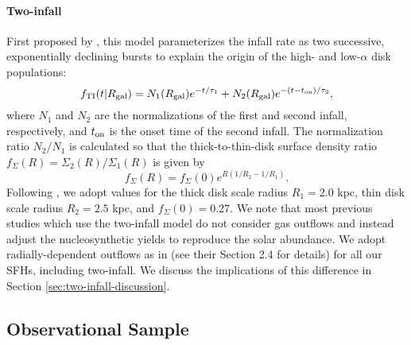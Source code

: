 \documentclass[twocolumn,twocolappendix,linenumbers,trackchanges]{aastex631}
\begin{document}
\paragraph{Two-infall} First proposed by \citet{Chiappini1997-TwoInfall}, this model parameterizes the infall rate as two successive, exponentially declining bursts to explain the origin of the high- and low-$\alpha$ disk populations:
\begin{equation}
    \label{eq:twoinfall-ifr}
    f_{\rm TI}(t|R_{\rm gal}) = N_1(R_{\rm gal}) e^{-t/\tau_1} + N_2(R_{\rm gal}) e^{-(t-t_{\rm on})/\tau_2},
\end{equation}
where $N_1$ and $N_2$ are the normalizations of the first and second infall, respectively, and $t_{\rm on}$ is the onset time of the second infall.
The normalization ratio $N_2/N_1$ is calculated so that the thick-to-thin-disk surface density ratio $f_\Sigma(R)=\Sigma_2(R)/\Sigma_1(R)$ is given by
\begin{equation}
    f_\Sigma(R) = f_\Sigma(0) e^{R(1/R_2 - 1/R_1)}.
\end{equation}
Following \citet{BlandHawthornGerhard2016-MilkyWayReview}, we adopt values for the thick disk scale radius $R_1=2.0$ kpc, thin disk scale radius $R_2=2.5$ kpc, and $f_\Sigma(0)=0.27$.
We note that most previous studies which use the two-infall model \citep[e.g.,][]{Spitoni2021-TwoInfall} do not consider gas outflows and instead adjust the nucleosynthetic yields to reproduce the solar abundance. We adopt radially-dependent outflows as in  (see their Section 2.4 for details) for all our SFHs, including two-infall. We discuss the implications of this difference in Section \ref{sec:two-infall-discussion}.

\subsection{Observational Sample}
\label{sec:observational-sample}
\end{document}
